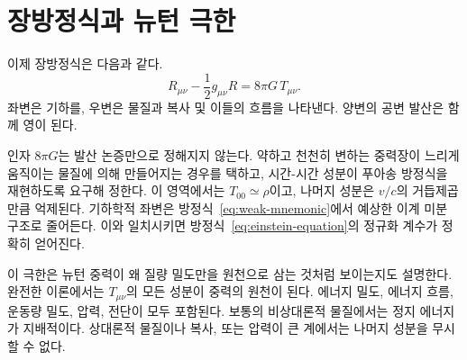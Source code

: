 \begin{classroomqa}
\end{classroomqa}

\begin{classroomqa}
\end{classroomqa}

\section{장방정식과 뉴턴 극한}

이제 장방정식은 다음과 같다.
\begin{equation}
 \boxed{
 R_{\mu\nu}-\frac12 g_{\mu\nu}R
 =
 8\pi G\,T_{\mu\nu}
 }.
 \label{eq:einstein-equation}
\end{equation}
좌변은 기하를, 우변은 물질과 복사 및 이들의 흐름을 나타낸다. 양변의 공변 발산은 함께 영이 된다.

인자 \(8\pi G\)는 발산 논증만으로 정해지지 않는다. 약하고 천천히 변하는 중력장이 느리게 움직이는 물질에 의해 만들어지는 경우를 택하고, 시간-시간 성분이 푸아송 방정식을 재현하도록 요구해 정한다. 이 영역에서는 \(T_{00}\simeq\rho\)이고, 나머지 성분은 \(v/c\)의 거듭제곱만큼 억제된다. 기하학적 좌변은 방정식~\eqref{eq:weak-mnemonic}에서 예상한 이계 미분 구조로 줄어든다. 이와 일치시키면 방정식~\eqref{eq:einstein-equation}의 정규화 계수가 정확히 얻어진다.

이 극한은 뉴턴 중력이 왜 질량 밀도만을 원천으로 삼는 것처럼 보이는지도 설명한다. 완전한 이론에서는 \(T_{\mu\nu}\)의 모든 성분이 중력의 원천이 된다. 에너지 밀도, 에너지 흐름, 운동량 밀도, 압력, 전단이 모두 포함된다. 보통의 비상대론적 물질에서는 정지 에너지가 지배적이다. 상대론적 물질이나 복사, 또는 압력이 큰 계에서는 나머지 성분을 무시할 수 없다.

